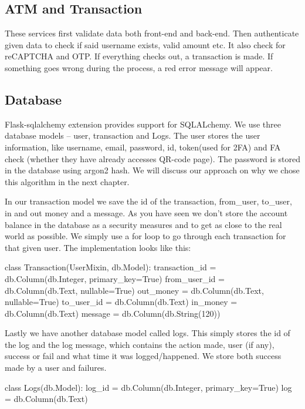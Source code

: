 \subsection{ATM and Transaction}

These services first validate data both front-end and back-end. Then authenticate given data to check if said username exists, valid amount etc. It also check for reCAPTCHA and OTP. If everything checks out, a transaction is made. If something goes wrong during the process, a red error message will appear. 

\subsection{Database}

Flask-sqlalchemy extension provides support for SQLALchemy. We use three database models – user, transaction and Logs. The user stores the user information, like username, email, password, id, token(used for 2FA) and FA check (whether they have already accesses QR-code page). The password is stored in the database using argon2 hash. We will discuss our approach on why we chose this algorithm in the next chapter. 

In our transaction model we save the id of the transaction, from\_user, to\_user, in and out money and a message. As you have seen we don’t store the account balance in the database as a security measures and to get as close to the real world as possible. We simply use a for loop to go through each transaction for that given user. The implementation looks like this:

\begin{python}
class Transaction(UserMixin, db.Model):
   transaction_id = db.Column(db.Integer, primary_key=True)
   from_user_id = db.Column(db.Text, nullable=True)  
   out_money = db.Column(db.Text, nullable=True)
   to_user_id = db.Column(db.Text) 
   in_money = db.Column(db.Text)
   message = db.Column(db.String(120))
\end{python}

Lastly we have another database model called logs. This simply stores the id of the log and the log message, which contains the action made, user (if any), success or fail and what time it was logged/happened. We store both success made by a user and failures. 

\begin{python}
class Logs(db.Model):
    log_id = db.Column(db.Integer, primary_key=True)
    log = db.Column(db.Text)
\end{python}
